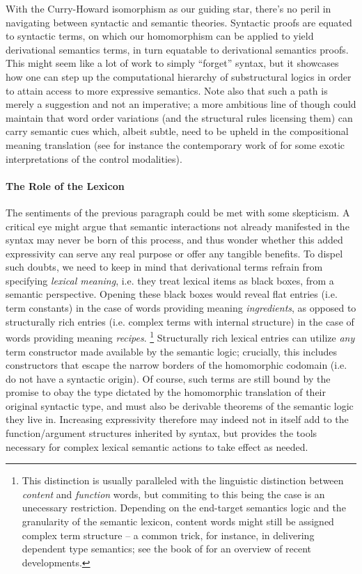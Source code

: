 With the Curry-Howard isomorphism as our guiding star, there's no peril in navigating between syntactic and semantic theories.
Syntactic proofs are equated to syntactic terms, on which our homomorphism can be applied to yield derivational semantics terms, in turn equatable to derivational semantics proofs.
This might seem like a lot of work to simply ``forget'' syntax, but it showcases how one can step up the computational hierarchy of substructural logics in order to attain access to more expressive semantics.
Note also that such a path is merely a suggestion and not an imperative; a more ambitious line of though could maintain that word order variations (and the structural rules licensing them) can carry semantic cues which, albeit subtle, need to be upheld in the compositional meaning translation (see for instance  the contemporary work of \citet{duarte2022quantum} for some exotic interpretations of the control modalities).

\paragraph{The Role of the Lexicon}
The sentiments of the previous paragraph could be met with some skepticism.
A critical eye might argue that semantic interactions not already manifested in the syntax may never be born of this process, and thus wonder whether this added expressivity can serve any real purpose or offer any tangible benefits.
To dispel such doubts, we need to keep in mind that derivational terms refrain from specifying \textit{lexical meaning}, i.e. they treat lexical items as black boxes, from a semantic perspective.
Opening these black boxes would reveal flat entries (i.e. term constants) in the case of words providing meaning \textit{ingredients}, as opposed to structurally rich entries (i.e. complex terms with internal structure) in the case of words providing meaning \textit{recipes}.%
\footnote{This distinction is usually paralleled with the linguistic distinction between \textit{content} and \textit{function} words, but commiting to this being the case is an unecessary restriction. Depending on the end-target semantics logic and the granularity of the semantic lexicon, content words might still be assigned complex term structure -- a common trick, for instance, in delivering dependent type semantics; see the book of \citet{chatzikyriakidis2020formal} for an overview of recent developments.}
Structurally rich lexical entries can utilize \textit{any} term constructor made available by the semantic logic; crucially, this includes constructors that escape the narrow borders of the homomorphic codomain (i.e. do not have a syntactic origin).
Of course, such terms are still bound by the promise to obay the type dictated by the homomorphic translation of their original syntactic type, and must also be derivable theorems of the semantic logic they live in.
Increasing expressivity therefore may indeed not in itself add to the function/argument structures inherited by syntax, but provides the tools necessary for complex lexical semantic actions to take effect as needed.

